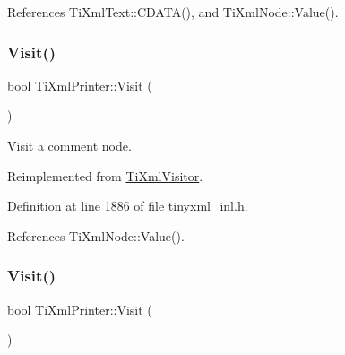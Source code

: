 References Ti\+Xml\+Text\+::\+C\+D\+A\+T\+A(), and Ti\+Xml\+Node\+::\+Value().

\hypertarget{class_ti_xml_printer_a9870423f5603630e6142f6bdb66dfb57}{}\label{class_ti_xml_printer_a9870423f5603630e6142f6bdb66dfb57} 
\subsubsection{\texorpdfstring{Visit()}{Visit()}\hspace{0.1cm}{\footnotesize\ttfamily [3/4]}}
{\footnotesize\ttfamily bool Ti\+Xml\+Printer\+::\+Visit (\begin{DoxyParamCaption}\item[{const \hyperlink{class_ti_xml_comment}{Ti\+Xml\+Comment} \&}]{ }\end{DoxyParamCaption})\hspace{0.3cm}{\ttfamily [virtual]}}



Visit a comment node. 



Reimplemented from \hyperlink{class_ti_xml_visitor_a53a60e7a528627b31af3161972cc7fa2}{Ti\+Xml\+Visitor}.



Definition at line 1886 of file tinyxml\+\_\+inl.\+h.



References Ti\+Xml\+Node\+::\+Value().

\hypertarget{class_ti_xml_printer_a08591a15c9a07afa83c24e08b03d6358}{}\label{class_ti_xml_printer_a08591a15c9a07afa83c24e08b03d6358} 
\subsubsection{\texorpdfstring{Visit()}{Visit()}\hspace{0.1cm}{\footnotesize\ttfamily [4/4]}}
{\footnotesize\ttfamily bool Ti\+Xml\+Printer\+::\+Visit (\begin{DoxyParamCaption}\item[{const \hyperlink{class_ti_xml_unknown}{Ti\+Xml\+Unknown} \&}]{ }\end{DoxyParamCaption})\hspace{0.3cm}{\ttfamily [virtual]}}



